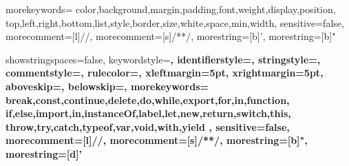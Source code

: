  {
	morekeywords={
		color,background,margin,padding,font,weight,display,position,
		top,left,right,bottom,list,style,border,size,white,space,min,width},
	sensitive=false,
	morecomment=[l]{//},
	morecomment=[s]{/*}{*/},
	morestring=[b]',
	morestring=[b]"
}

 {
showstringspaces=false,
keywordstyle=\ttfamily\bfseries\color{darkblue},
identifierstyle=\ttfamily,
stringstyle=\ttfamily\color{forestgreen},
commentstyle=\color{gray},
rulecolor=\color{gray},
xleftmargin=5pt,
xrightmargin=5pt,
aboveskip=\bigskipamount,
belowskip=\bigskipamount,
%
morekeywords={
	break,const,continue,delete,do,while,export,for,in,function,
	if,else,import,in,instanceOf,label,let,new,return,switch,this,
	throw,try,catch,typeof,var,void,with,yield
},
sensitive=false,
morecomment=[l]{//},
morecomment=[s]{/*}{*/},
morestring=[b]",
morestring=[d]'
}